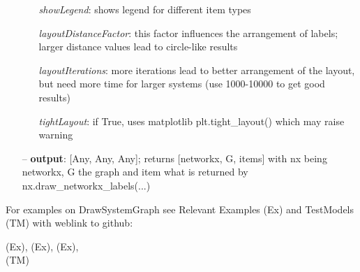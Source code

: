 \begin{itemize}[leftmargin=0.7cm]
\begin{itemize}[leftmargin=1.2cm]
\item[]{\it showLegend}: shows legend for different item types
\item[]{\it layoutDistanceFactor}: this factor influences the arrangement of labels; larger distance values lead to circle-like results
\item[]{\it layoutIterations}: more iterations lead to better arrangement of the layout, but need more time for larger systems (use 1000-10000 to get good results)
\item[]{\it tightLayout}: if True, uses matplotlib plt.tight\_layout() which may raise warning
\end{itemize}
\item[--]
{\bf output}: [Any, Any, Any]; returns [networkx, G, items] with nx being networkx, G the graph and item what is returned by nx.draw\_networkx\_labels(...)
\vspace{12pt}\end{itemize}
%

%
\noindent For examples on DrawSystemGraph see Relevant Examples (Ex) and TestModels (TM) with weblink to github:
\bi
 \item \footnotesize {} (Ex), 
 (Ex), 
 (Ex), 
\\  (TM)
\ei

%
